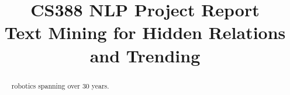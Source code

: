 \documentclass[conference]{IEEEtran}
\begin{document}
\title{\large{CS388 NLP Project Report}\\ \huge{Text Mining for Hidden Relations and Trending}}

\author{
\and
{}
}
\maketitle
\onehalfspace
\begin{abstract}
robotics spanning over 30 years.
\end{abstract}

%
%
%
%
\end{document}
